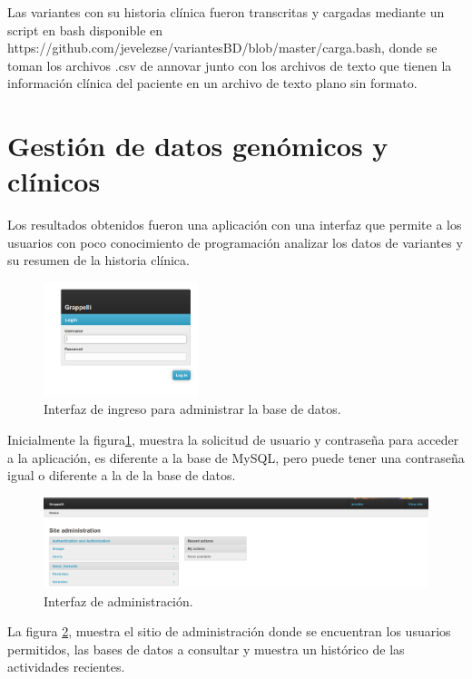Las variantes con su historia clínica fueron transcritas y cargadas mediante un script en bash disponible en https://github.com/jevelezse/variantesBD/blob/master/carga.bash, donde se toman los archivos .csv de annovar junto con los archivos de texto que tienen la información clínica del paciente en un archivo de texto plano sin formato.

\section{Gestión de datos genómicos y clínicos}

Los resultados obtenidos fueron una aplicación con una interfaz que permite a los usuarios con poco conocimiento de  programación  analizar los datos de variantes y su resumen de la historia clínica. \\

\begin{figure}[H] 
	\centering
	\includegraphics[width=0.4\textwidth]{Kap3/admin_django}
	\caption{Interfaz de ingreso para  administrar la base de datos.} \label{fig:admin}
\end{figure}

Inicialmente la figura\ref{fig:admin}, muestra la solicitud de usuario y contraseña para acceder a la aplicación, es diferente a la base de MySQL, pero  puede tener  una contraseña igual o diferente a la de la base de datos.\\

\begin{figure}[H] 
	\centering
	\includegraphics[width=1\textwidth]{Kap3/django_admin}
	\caption{Interfaz de administración.} \label{fig:admin2}
\end{figure}

La figura \ref{fig:admin2}, muestra el sitio de administración donde se encuentran los usuarios permitidos, las bases de datos a consultar y muestra un histórico de las actividades recientes. \\

